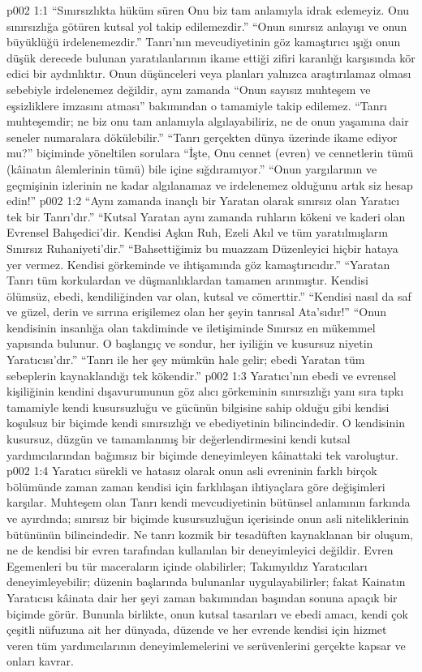 \vs p002 1:1 “Sınırsızlıkta hüküm süren Onu biz tam anlamıyla idrak edemeyiz. Onu sınırsızlığa götüren kutsal yol takip edilemezdir.” “Onun sınırsız anlayışı ve onun büyüklüğü irdelenemezdir.” Tanrı’nın mevcudiyetinin göz kamaştırıcı ışığı onun düşük derecede bulunan yaratılanlarının ikame ettiği zifiri karanlığı karşısında kör edici bir aydınlıktır. Onun düşünceleri veya planları yalnızca araştırılamaz olması sebebiyle irdelenemez değildir, aynı zamanda “Onun sayısız muhteşem ve eşsizliklere imzasını atması” bakımından o tamamiyle takip edilemez. “Tanrı muhteşemdir; ne biz onu tam anlamıyla algılayabiliriz, ne de onun yaşamına dair seneler numaralara dökülebilir.” “Tanrı gerçekten dünya üzerinde ikame ediyor mu?” biçiminde yöneltilen sorulara “İşte, Onu cennet (evren) ve cennetlerin tümü (kâinatın âlemlerinin tümü) bile içine sığdıramıyor.” “Onun yargılarının ve geçmişinin izlerinin ne kadar algılanamaz ve irdelenemez olduğunu artık siz hesap edin!”
\vs p002 1:2 “Aynı zamanda inançlı bir Yaratan olarak sınırsız olan Yaratıcı tek bir Tanrı’dır.” “Kutsal Yaratan aynı zamanda ruhların kökeni ve kaderi olan Evrensel Bahşedici’dir. Kendisi Aşkın Ruh, Ezeli Akıl ve tüm yaratılmışların Sınırsız Ruhaniyeti’dir.” “Bahsettiğimiz bu muazzam Düzenleyici hiçbir hataya yer vermez. Kendisi görkeminde ve ihtişamında göz kamaştırıcıdır.” “Yaratan Tanrı tüm korkulardan ve düşmanlıklardan tamamen arınmıştır. Kendisi ölümsüz, ebedi, kendiliğinden var olan, kutsal ve cömerttir.” “Kendisi nasıl da saf ve güzel, derin ve sırrına erişilemez olan her şeyin tanrısal Ata’sıdır!” “Onun kendisinin insanlığa olan takdiminde ve iletişiminde Sınırsız en mükemmel yapısında bulunur. O başlangıç ve sondur, her iyiliğin ve kusursuz niyetin Yaratıcısı’dır.” “Tanrı ile her şey mümkün hale gelir; ebedi Yaratan tüm sebeplerin kaynaklandığı tek kökendir.”
\vs p002 1:3 Yaratıcı’nın ebedi ve evrensel kişiliğinin kendini dışavurumunun göz alıcı görkeminin sınırsızlığı yanı sıra tıpkı tamamiyle kendi kusursuzluğu ve gücünün bilgisine sahip olduğu gibi kendisi koşulsuz bir biçimde kendi sınırsızlığı ve ebediyetinin bilincindedir. O kendisinin kusursuz, düzgün ve tamamlanmış bir değerlendirmesini kendi kutsal yardımcılarından bağımsız bir biçimde deneyimleyen kâinattaki tek varoluştur.
\vs p002 1:4 Yaratıcı sürekli ve hatasız olarak onun asli evreninin farklı birçok bölümünde zaman zaman kendisi için farklılaşan ihtiyaçlara göre değişimleri karşılar. Muhteşem olan Tanrı kendi mevcudiyetinin bütünsel anlamının farkında ve ayırdında; sınırsız bir biçimde kusursuzluğun içerisinde onun asli niteliklerinin bütününün bilincindedir. Ne tanrı kozmik bir tesadüften kaynaklanan bir oluşum, ne de kendisi bir evren tarafından kullanılan bir deneyimleyici değildir. Evren Egemenleri bu tür maceraların içinde olabilirler; Takımyıldız Yaratıcıları deneyimleyebilir; düzenin başlarında bulunanlar uygulayabilirler; fakat Kainatın Yaratıcısı kâinata dair her şeyi zaman bakımından başından sonuna apaçık bir biçimde görür. Bununla birlikte, onun kutsal tasarıları ve ebedi amacı, kendi çok çeşitli nüfuzuna ait her dünyada, düzende ve her evrende kendisi için hizmet veren tüm yardımcılarının deneyimlemelerini ve serüvenlerini gerçekte kapsar ve onları kavrar.
